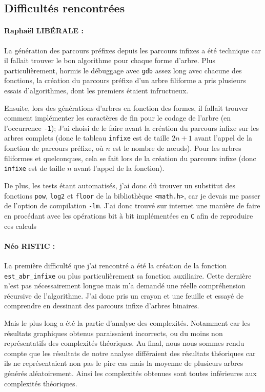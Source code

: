 \documentclass[12pt, a4paper]{article}
\begin{document}
\subsection{Difficultés rencontrées}

\paragraph{Raphaël LIBÉRALE :}
La génération des parcours préfixes depuis les parcours infixes a été technique car il fallait trouver le bon algorithme pour chaque forme d'arbre. Plus particulièrement, hormis le débuggage avec \texttt{gdb} assez long avec chacune des fonctions, la création du parcours préfixe d'un arbre filiforme a pris plusieurs essais d'algorithmes, dont les premiers étaient infructueux. 

 Ensuite, lors des générations d'arbres en fonction des formes, il fallait trouver comment implémenter les caractères de fin pour le codage de l'arbre (en l'occurrence \texttt{-1}); J'ai choisi de le faire avant la création du parcours infixe sur les arbres complets (donc le tableau \texttt{infixe} est de taille $2n + 1$ avant l'appel de la fonction de parcours préfixe, où $n$ est le nombre de nœuds). Pour les arbres filiformes et quelconques, cela se fait lors de la création du parcours infixe (donc \texttt{infixe} est de taille $n$ avant l'appel de la fonction). 
 
 De plus, les tests étant automatisés, j'ai donc dû trouver un substitut des fonctions \texttt{pow}, \texttt{log2} et \texttt{floor} de la bibliothèque \texttt{<math.h>}, car je devais me passer de l'option de compilation \texttt{-lm}. J'ai donc trouvé sur internet une manière de faire en procédant avec les opérations bit à bit implémentées en \texttt{C} afin de reproduire ces calculs


\paragraph{Néo RISTIC :}
La première difficulté que j'ai rencontré a été la création de la fonction \texttt{est\_abr\_infixe} ou plus particulièrement sa fonction auxiliaire. Cette dernière n'est pas nécessairement longue mais m'a demandé une réelle compréhension récursive de l'algorithme. J'ai donc pris un crayon et une feuille et essayé de comprendre en dessinant des parcours infixe d'arbres binaires.

Mais le plus long a été la partie d'analyse des complexités. Notamment car les résultats graphiques obtenus paraissaient incorrects, ou du moins non représentatifs des complexités théoriques. Au final, nous nous sommes rendu compte que les résultats de notre analyse différaient des résultats théoriques car ils ne représentaient non pas le pire cas mais la moyenne de plusieurs arbres générés aléatoirement. Ainsi les complexités obtenues sont toutes inférieures aux complexités théoriques.
\end{document}
